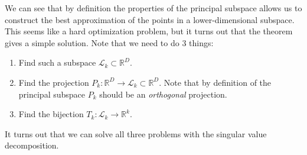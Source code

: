 \documentclass{article}
\begin{document}
  We can see that by definition the properties of the principal subspace allows us to construct the best approximation of the points in a lower-dimensional subspace. This seems like a hard optimization problem, but it turns out that the theorem gives a simple solution. Note that we need to do 3 things: 
  \begin{enumerate}
    \item Find such a subspace $\mathcal{L}_k \subset \mathbb{R}^D$. 
    \item Find the projection $P_k: \mathbb{R}^D \rightarrow \mathcal{L}_k \subset \mathbb{R}^D$. Note that by definition of the principal subspace $P_k$ should be an \textit{orthogonal} projection. 
    \item Find the bijection $T_k: \mathcal{L}_k \rightarrow \mathbb{R}^k$. 
  \end{enumerate}
  It turns out that we can solve all three problems with the singular value decomposition. 
\end{document}
